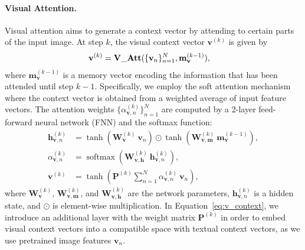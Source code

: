 \documentclass[10pt,twocolumn,letterpaper]{article}
\begin{document}
\paragraph{Visual Attention.}
Visual attention aims to generate a context vector by attending to certain parts of the input image.
At step $k$, the visual context vector $\mathbf{v}^{(k)}$ is given by
\begin{align}
\mathbf{v}^{(k)} &= \operatorname{\bf{V\_Att}}(\{\mathbf{v}_n\}_{n=1}^N, \mathbf{m}_\mathbf{v}^{(k-1)}),
\label{eq:v_att}
\end{align}
where $\mathbf{m}_\mathbf{v}^{(k-1)}$ is a memory vector encoding the information that has been attended until step $k-1$.
Specifically, we employ the soft attention mechanism where the context vector is obtained from a weighted average of input feature vectors.
The attention weights $\{\alpha_{\mathbf{v},n}^{(k)}\}_{n=1}^N$ are computed by a 2-layer feed-forward neural network (FNN) and the softmax function:
\begin{align}
\mathbf{h}_{\mathbf{v},n}^{(k)} &= \tanh \left( \mathbf{W}_\mathbf{v}^{(k)}~\mathbf{v}_n \right) 
				   	     \odot \tanh \left( \mathbf{W}_{\mathbf{v},\mathbf{m}}^{(k)}~\mathbf{m}_\mathbf{v}^{(k-1)} \right), \\
\alpha_{\mathbf{v},n}^{(k)} &= \operatorname{softmax} \left( \mathbf{W}_{\mathbf{v},\mathbf{h}}^{(k)}~\mathbf{h}_{\mathbf{v},n}^{(k)} \right), \\
\mathbf{v}^{(k)} &= \tanh \left( \mathbf{P}^{(k)} \sum_{n=1}^N {\alpha_{\mathbf{v},n}^{(k)}~\mathbf{v}_n} \right),
\label{eq:v_context}
\end{align}
where $\mathbf{W}_\mathbf{v}^{(k)}$, $\mathbf{W}_{\mathbf{v},\mathbf{m}}^{(k)}$, and $\mathbf{W}_{\mathbf{v},\mathbf{h}}^{(k)}$ are the network parameters, $\mathbf{h}_{\mathbf{v},n}^{(k)}$ is a hidden state, and $\odot$ is element-wise multiplication.
In Equation~\ref{eq:v_context}, we introduce an additional layer with the weight matrix $\mathbf{P}^{(k)}$ in order to embed visual context vectors into a compatible space with textual context vectors, as we use pretrained image features $\mathbf{v}_n$.
\end{document}
